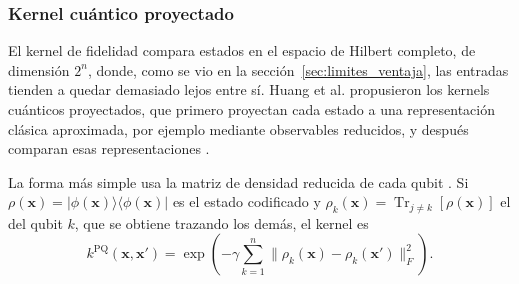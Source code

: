 
\subsubsection{Kernel cuántico proyectado}
\label{sec:kernel_proyectado}

El kernel de fidelidad compara estados en el espacio de Hilbert completo, de dimensión $2^n$, donde, como se vio en la sección~\ref{sec:limites_ventaja}, las entradas tienden a quedar demasiado lejos entre sí. Huang et al. propusieron los kernels cuánticos proyectados, que primero proyectan cada estado a una representación clásica aproximada, por ejemplo mediante observables reducidos, y después comparan esas representaciones \cite{huang2021power}.

La forma más simple usa la matriz de densidad reducida de cada qubit \cite{huang2021power}. Si $\rho(\mathbf{x}) = |\phi(\mathbf{x})\rangle\langle\phi(\mathbf{x})|$ es el estado codificado y $\rho_k(\mathbf{x}) = \operatorname{Tr}_{j \neq k}[\rho(\mathbf{x})]$ el del qubit $k$, que se obtiene trazando los demás, el kernel es
\begin{equation}
  k^{\mathrm{PQ}}(\mathbf{x}, \mathbf{x}') = \exp\!\left(-\gamma \sum_{k=1}^{n} \bigl\lVert \rho_k(\mathbf{x}) - \rho_k(\mathbf{x}') \bigr\rVert_F^2\right).
  \label{eq:kpq}
\end{equation}

